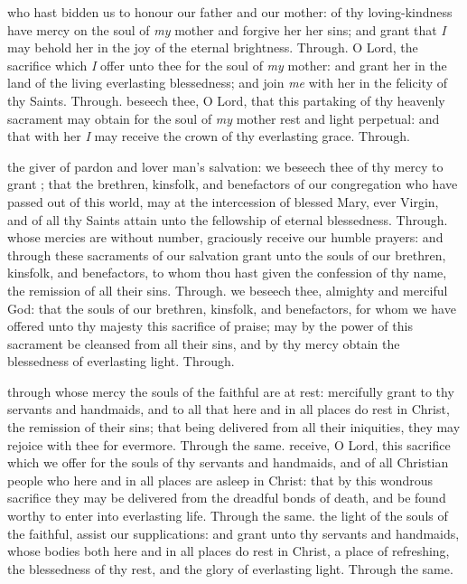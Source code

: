 \begin{multicols}{2}
 who hast bidden us to honour our father and our mother: of thy loving-kindness have mercy on the soul of \textit{my} mother and forgive her her sins; and grant that \textit{I} may behold her in the joy of the eternal brightness. Through.
 O Lord, the sacrifice which \textit{I} offer unto thee for the soul of \textit{my} mother: and grant her in the land of the living everlasting blessedness; and join \textit{me} with her in the felicity of thy Saints. Through.
 beseech thee, O Lord, that this partaking of thy heavenly sacrament may obtain for the soul of \textit{my} mother rest and light perpetual: and that with her \textit{I} may receive the crown of thy everlasting grace. Through.

\vspace{3\baselineskip}

 the giver of pardon and lover man's salvation: we beseech thee of thy mercy to grant ;
that the brethren, kinsfolk, and benefactors of our congregation who have passed out of this world, may at the intercession of blessed Mary, ever Virgin, and of all thy Saints attain unto the fellowship of eternal blessedness. Through.
 whose mercies are without number, graciously receive our humble prayers: and through these sacraments of our salvation grant unto the souls of our brethren, kinsfolk, and benefactors, to whom thou hast given the confession of thy name, the remission of all their sins. Through.
 we beseech thee, almighty and merciful God: that the souls of our brethren, kinsfolk, and benefactors, for whom we have offered unto thy majesty this sacrifice of praise; may by the power of this sacrament be cleansed from all their sins, and by thy mercy obtain the blessedness of everlasting light.
Through.

 through whose mercy the souls of the faithful are at rest: mercifully grant to thy servants and handmaids, and to all that here and in all places do rest in Christ, the remission of their sins; that being delivered from all their iniquities, they may rejoice with thee for evermore. Through the same.
 receive, O Lord, this sacrifice which we offer for the souls of thy servants and handmaids, and of all Christian people who here and in all places are asleep in Christ: that by this wondrous sacrifice they may be delivered from the dreadful bonds of death, and be found worthy to enter into everlasting life. Through the same.
 the light of the souls of the faithful, assist our supplications: and grant unto thy servants and handmaids, whose bodies both here and in all places do rest in Christ, a place of refreshing, the blessedness of thy rest, and the glory of everlasting light. Through the same.


\end{multicols}
